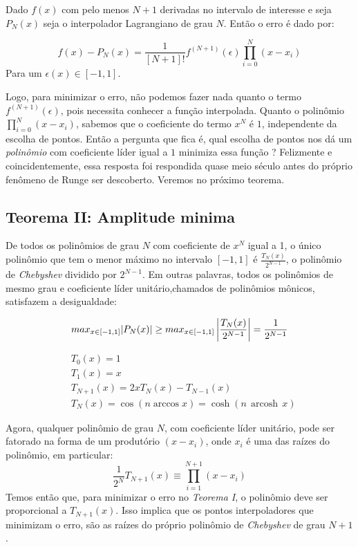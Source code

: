  Dado $f(x)$  com pelo menos $N+1$ derivadas no intervalo de interesse e seja $P_N(x)$ seja o interpolador Lagrangiano de grau $N$. Então o erro é dado por:
 
 \begin{equation}
 f(x) - P_N(x) = \frac{1}{[N+1]!}f^{(N+1)}(\epsilon)\prod^{N}_{i = 0} (x - x_i)
 \end{equation}
 Para um $\epsilon(x) \in [-1,1]$.
 
 Logo, para minimizar o erro, não podemos fazer nada quanto o termo $f^(N+1)(\epsilon)$, pois necessita conhecer a função interpolada. Quanto o polinômio $\prod^{N}_{i = 0} (x - x_i)$, sabemos que o coeficiente do termo $x^N$ é $1$, independente da escolha de pontos. Então a pergunta que fica é, qual escolha de pontos nos dá um \emph{polinômio} com coeficiente líder igual a $1$ minimiza essa função ? Felizmente e coincidentemente, essa resposta foi respondida quase meio século antes do próprio fenômeno de Runge ser descoberto. Veremos no próximo teorema.

 
\subsection{Teorema II: Amplitude minima}
 De todos os polinômios de grau $N$ com coeficiente de $x^N$ igual a 1, o único polinômio que tem o menor máximo no intervalo $[-1,1]$ é $\frac{T_N(x)}{2^{N-1}}$, o polinômio de \emph{Chebyshev}  dividido por $2^{N-1}$. Em outras palavras, todos os polinômios de mesmo grau e coeficiente líder unitário,chamados de polinômios mônicos, satisfazem a desigualdade:

\begin{equation}
	max_{x \in [-1,1]}|P_N(x)| \geq  max_{x \in [-1,1]} \left |\frac{T_N(x)}{2^{N-1}}  \right |  = \frac{1}{2^{N-1}}\\
\end{equation}

\begin{align}
    &T_0(x) = 1\\
    &T_1(x) = x\\
    &T_{N+1}(x) = 2xT_N(x) - T_{N-1}(x)\\
    &T_{N}(x) =\cos(n \arccos x)=\cosh(n\,\operatorname{arcosh}\,x)
\end{align}

 Agora, qualquer polinômio de grau $N$, com coeficiente líder unitário, pode ser fatorado na forma de um produtório  $(x - x_i)$, onde $x_i$ é uma das raízes do polinômio, em particular: 
 \begin{equation}
 \frac{1}{2^N}T_{N+1}(x) \equiv \prod_{i = 1}^{N+1} (x-x_i)
 \end{equation}
 Temos então que, para minimizar o erro no \emph{Teorema I}, o polinômio deve ser proporcional a $T_{N+1}(x)$. Isso implica que  os pontos interpoladores que minimizam o erro, são as raízes do próprio polinômio de \emph{Chebyshev} de grau $N+1$.
 
